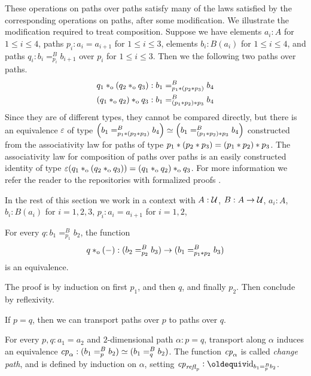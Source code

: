 \documentclass[a4paper,12pt]{amsart}
\begin{document}
These operations on paths over paths satisfy many of the laws satisfied by the corresponding operations on paths, after some modification.  We
illustrate the modification required to treat composition.  Suppose we have elements $a_i : A$ for $1 \le i \le 4$, paths $p_i : a_i = a_{i+1}$
for $1 \le i \le 3$, elements $b_i:B(a_i)$ for $1 \le i \le 4$, and paths $q_i : b_i =^B_{p_i} b_{i+1}$ over $p_i$ for $1 \le i \le 3$.
Then we the following two paths over paths.
\begin{align*}
   q_1 *_{\mathrm{o}} (q_2 *_{\mathrm{o}} q_3) & : b_1 =^B_{p_1* (p_2* p_3)} b_4 \\
  (q_1 *_{\mathrm{o}} q_2) *_{\mathrm{o}} q_3  & : b_1 =^B_{(p_1* p_2) * p_3} b_4
\end{align*}
Since they are of different types, they cannot be compared directly, but there is an
equivalence $\varepsilon$ of type $\left( b_1 =^B_{p_1* (p_2* p_3)} b_4 \right) \simeq \left( b_1 =^B_{(p_1* p_2) * p_3} b_4 \right)$
constructed from the associativity law for paths of type $p_1*(p_2* p_3) = (p_1* p_2)* p_3$.
The associativity law for composition of paths over paths is an easily constructed identity of type $\varepsilon(q_1 *_{\mathrm{o}} (q_2 *_{\mathrm{o}} q_3)) = (q_1 *_{\mathrm{o}} q_2)*_{\mathrm{o}} q_3$.
For more information we refer the reader to the repositories with formalized proofs \cite{circleind-Dan}. 

In the rest of this section we work in a context with
$A : \mathcal{U}$, $B : A \to \mathcal{U}$, $a_i:A$, $b_i:B(a_i)$ for $i=1,2,3$, 
$p_i : a_i = a_{i+1}$ for $i=1,2$,

\begin{lemma}\label{lem:compo-over}
  For every $q : b_1 =^B_{p_1} b_2$, the
  function
  \[
    q *_{\mathrm{o}} ({-}) : (b_2 =^B_{p_2} b_3) \to (b_1 =^B_{p_1* p_2} b_3)
  \]
  is an equivalence.
\end{lemma}
The proof is by induction on first $p_1$, and then $q$, and finally $p_2$.
Then conclude by reflexivity.

If $p=q$, then we can transport paths over $p$ to paths over $q$.

\begin{definition}\label{def:pathover-change-path}
  For every $p,q:a_1=a_2$ and $2$-dimensional path $\alpha : p = q$,
  transport along $\alpha$
  induces an equivalence $\mathit{cp}_{\alpha}: (b_1 =^B_p b_2) \simeq (b_1 =^B_q b_2)$.
  The function $\mathit{cp}_{\alpha}$ is called \emph{change path}, and is defined
  by induction on $\alpha$, setting $\cp{\refl{p}}\defeq \id_{b_1 =^B_p b_2}$.
\end{definition}
\end{document}
